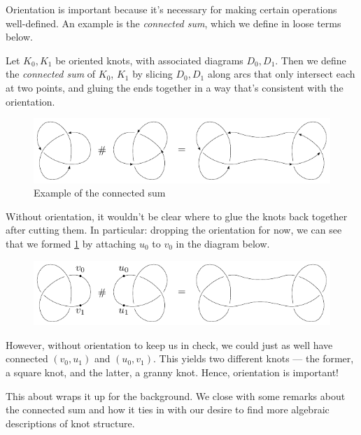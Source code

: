 Orientation is important because it's necessary for making certain
operations well-defined. An example is the \emph{connected sum}, which
we define in loose terms below.
\begin{definition}
  Let $K_0, K_1$ be oriented knots, with associated diagrams $D_0,
  D_1$. Then we define the \emph{connected sum} of $K_0$, $K_1$ by
  slicing $D_0, D_1$ along arcs that only intersect each at two
  points, and gluing the ends together in a way that's consistent with
  the orientation.
\end{definition}
\begin{figure}[H]
  \centering
  \includegraphics[scale=1.2]{figures/background/conn_sum.pdf}
  \caption{Example of the connected sum}
  \label{fig:conn-sum-example}
\end{figure}
Without orientation, it wouldn't be clear where to glue the knots back
together after cutting them. In particular: dropping the orientation
for now, we can see that we formed \cref{fig:conn-sum-example} by
attaching $u_0$ to $v_0$ in the diagram below.
\begin{figure}[H]
  \centering
  \includegraphics[scale=1.2]{figures/fundamentals/conn-sum-uo.pdf}
\end{figure}
However, without orientation to keep us in check, we could just as
well have connected $(v_0, u_1)$ and $(u_0, v_1)$. This yields two
different knots --- the former, a square knot, and the latter, a
granny knot. Hence, orientation is important!

This about wraps it up for the background. We close with some remarks
about the connected sum and how it ties in with our desire to find
more algebraic descriptions of knot structure.


